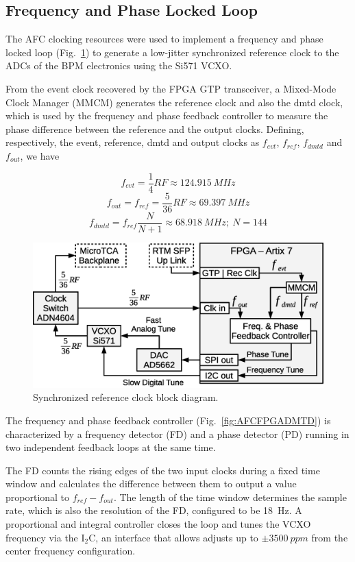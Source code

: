 \documentclass[a4paper,
               biblatex,      %
               ]{jacow}
\begin{document}
\subsection{Frequency and Phase Locked Loop}
The AFC clocking resources were used to implement a frequency and phase locked loop (Fig.~\ref{fig:AFCRefClockLoop}) to generate a low-jitter synchronized reference clock to the ADCs of the BPM electronics using the Si571 VCXO.
 
From the event clock recovered by the FPGA GTP transceiver, a Mixed-Mode Clock Manager (MMCM) generates the reference clock and also the dmtd clock, which is used by the frequency and phase feedback controller to measure the phase difference between the reference and the output clocks. Defining, respectively, the event, reference, dmtd and output clocks as $f_{evt}$, $f_{ref}$, $f_{dmtd}$ and $f_{out}$, we have

\[f_{evt} = \frac{1}{4}RF \approx 124.915~MHz\]
\[f_{out} = f_{ref} = \frac{5}{36}RF \approx 69.397~MHz\]
\[f_{dmtd} = f_{ref}\frac{N}{N+1} \approx 68.918~MHz;~N=144\]

\begin{figure}[!htb]
   \centering
   \includegraphics*[width=0.9\columnwidth]{AFCRefClockLoop}
   \caption{Synchronized reference clock block diagram.}
   \label{fig:AFCRefClockLoop}
\end{figure}

The frequency and phase feedback controller (Fig.~\ref{fig:AFCFPGADMTD}) is characterized by a frequency detector (FD) and a phase detector (PD) running in two independent feedback loops at the same time.

The FD counts the rising edges of the two input clocks during a fixed time window and calculates the difference between them to output a value proportional to $f_{ref}-f_{out}$. The length of the time window determines the sample rate, which is also the resolution of the FD, configured to be 18~Hz. A proportional and integral controller closes the loop and tunes the VCXO frequency via the I$_{2}$C, an interface that allows adjusts up to $\pm3500~ppm$ from the center frequency configuration. 
\end{document}
